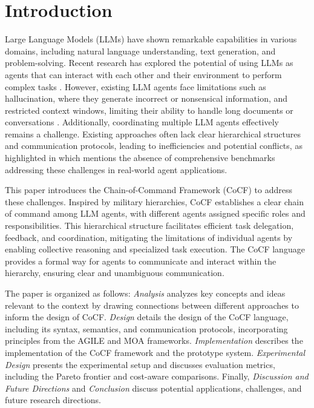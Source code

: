 \section{Introduction}
\label{sec:Introduction}

Large Language Models (LLMs) have shown remarkable capabilities in various domains,
including natural language understanding, text generation, and problem-solving. Recent
research has explored the potential of using LLMs as agents that can interact with
each other and their environment to perform complex tasks \cite{li2023camelcommunicativeagentsmind,yao2023reactsynergizingreasoningacting,wang_2024,schick2023toolformerlanguagemodelsteach}.
However, existing LLM agents face limitations such as hallucination, where they
generate incorrect or nonsensical information, and restricted context windows,
limiting their ability to handle long documents or conversations
\cite{hao2023reasoninglanguagemodelplanning}. Additionally, coordinating
multiple LLM agents effectively remains a challenge. Existing approaches often lack
clear hierarchical structures and communication protocols, leading to
inefficiencies and potential conflicts, as highlighted in \cite{feng2024agilenovelreinforcementlearning}
which mentions the absence of comprehensive benchmarks addressing these challenges
in real-world agent applications.

This paper introduces the Chain-of-Command Framework (CoCF) to address these challenges.
Inspired by military hierarchies, CoCF establishes a clear chain of command among
LLM agents, with different agents assigned specific roles and responsibilities. This
hierarchical structure facilitates efficient task delegation, feedback, and coordination,
mitigating the limitations of individual agents by enabling collective reasoning
and specialized task execution. The CoCF language provides a formal way for agents
to communicate and interact within the hierarchy, ensuring clear and unambiguous
communication.

The paper is organized as follows: \textit{Analysis} analyzes key concepts and
ideas relevant to the context by drawing connections between different
approaches to inform the design of CoCF. \textit{Design} details the design of
the CoCF language, including its syntax, semantics, and communication protocols,
incorporating principles from the AGILE and MOA frameworks. \textit{Implementation}
describes the implementation of the CoCF framework and the prototype system. \textit{Experimental
Design} presents the experimental setup and discusses evaluation metrics, including
the Pareto frontier and cost-aware comparisons. Finally, \textit{Discussion and
Future Directions} and \textit{Conclusion} discuss potential applications,
challenges, and future research directions.

